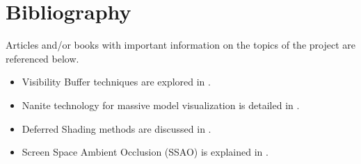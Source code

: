 \documentclass {article}
\begin{document}
\section{Bibliography}
     Articles and/or books with important information on the topics of the project are referenced below.
     
\begin{itemize}
     \item Visibility Buffer techniques are explored in \cite{FilmicWorlds}.
     \item Nanite technology for massive model visualization is detailed in \cite{Karis2021Nanite}.
     \item Deferred Shading methods are discussed in \cite{LearnOpenGLDeferred}.
     \item Screen Space Ambient Occlusion (SSAO) is explained in \cite{LearnOpenGLSSAO}.
\end{itemize}

\newpage
\end{document}
